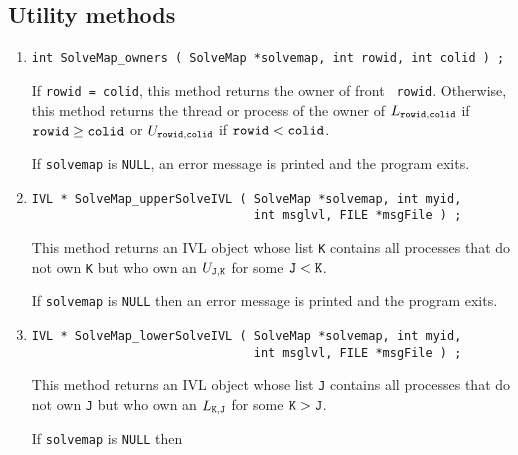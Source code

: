 \subsection{Utility methods}
\label{subsection:SolveMap:proto:utilities}
\par
\begin{enumerate}
\item
\begin{verbatim}
int SolveMap_owners ( SolveMap *solvemap, int rowid, int colid ) ;
\end{verbatim}
If {\tt rowid = colid}, this method returns the owner of front {\tt
rowid}.
Otherwise,
this method returns the thread or process of the owner of
$L_{{\tt rowid},{\tt colid}}$ if ${\tt rowid} \ge {\tt colid}$
or
$U_{{\tt rowid},{\tt colid}}$ if ${\tt rowid} < {\tt colid}$.
\par {}
If {\tt solvemap} is {\tt NULL},
an error message is printed and the program exits.
\item
\begin{verbatim}
IVL * SolveMap_upperSolveIVL ( SolveMap *solvemap, int myid,
                               int msglvl, FILE *msgFile ) ;
\end{verbatim}
This method returns an IVL object whose list {\tt K} contains all
processes that do not own {\tt K} but who own an $U_{\tt J,K}$ for
some ${\tt J} < {\tt K}$.
\par {}
If {\tt solvemap} is {\tt NULL} then 
an error message is printed and the program exits.
\item
\begin{verbatim}
IVL * SolveMap_lowerSolveIVL ( SolveMap *solvemap, int myid,
                               int msglvl, FILE *msgFile ) ;
\end{verbatim}
This method returns an IVL object whose list {\tt J} contains all
processes that do not own {\tt J} but who own an $L_{\tt K,J}$ for
some ${\tt K} > {\tt J}$.
\par {}
If {\tt solvemap} is {\tt NULL} then 

\end{enumerate}
